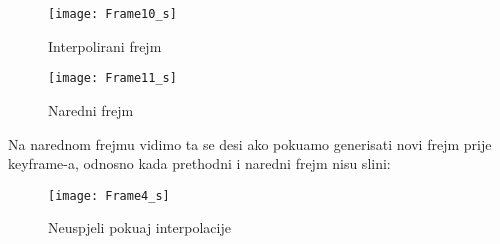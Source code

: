 \begin{figure}[H]
\caption{Interpolirani frejm}
\texttt{[image: Frame10\_s]}
\centering
\end{figure}

\begin{figure}[H]
\caption{Naredni frejm}
\texttt{[image: Frame11\_s]}
\centering
\end{figure}

Na narednom frejmu vidimo \sh ta se desi ako poku\sh amo generisati novi frejm prije keyframe-a, odnosno kada prethodni i naredni frejm nisu sli\ch ni:

\begin{figure}[H]
\caption{Neuspjeli poku\sh aj interpolacije}
\texttt{[image: Frame4\_s]}
\centering
\end{figure}